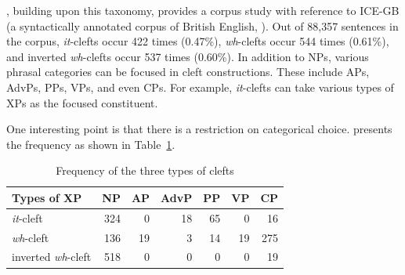 

\noindent \citet{kim:07}, building upon this taxonomy, provides a
corpus study with reference to ICE-GB (a syntactically annotated
corpus of British English, \citealt{nelson:etal:02}). Out of 88,357
sentences in the corpus, \textit{it}-clefts occur 422 times (0.47\%),
\textit{wh}-clefts occur 544 times (0.61\%), and inverted
\textit{wh}-clefts occur 537 times (0.60\%). In addition to NPs,
various phrasal categories can be focused in cleft
constructions. These include APs, AdvPs, PPs, VPs, and even CPs. For
example, \textit{it}-clefts can take various types of XPs as the
focused constituent.





\noindent One interesting point is that there is a restriction on
categorical choice. \citet[p.\ 220--223]{kim:07} presents the
frequency as shown in Table~\ref{tbl:freq:cleft}.


\begin{table}[!h]
\caption{Frequency of the three types of clefts \citep{kim:07}}   
\centering
\begin{tabular}{|l||r|r|r|r|r|r|}
\hline
Types of XP & NP & AP & AdvP & PP & VP & CP \\
\hline
\textit{it}-cleft & 324 & 0 & 18 & 65 & 0 & 16 \\
\hline
\textit{wh}-cleft & 136 & 19 & 3 & 14 & 19 & 275 \\
\hline
inverted \textit{wh}-cleft & 518 & 0 & 0 & 0 & 0 & 19 \\
\hline
\end{tabular}
\label{tbl:freq:cleft}
\end{table}

